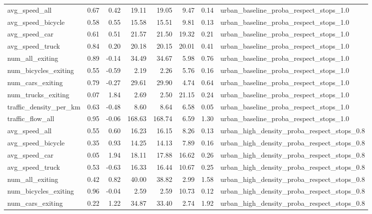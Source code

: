 \begin{table}[ht]
\begin{tabular}{lrrrrrrl}
  avg\_speed\_all & 0.67 & 0.42 & 19.11 & 19.05 & 9.47 & 0.14 & urban\_baseline\_proba\_respect\_stops\_1.0 \\ 
  avg\_speed\_bicycle & 0.58 & 0.55 & 15.58 & 15.51 & 9.81 & 0.13 & urban\_baseline\_proba\_respect\_stops\_1.0 \\ 
  avg\_speed\_car & 0.61 & 0.51 & 21.57 & 21.50 & 19.32 & 0.21 & urban\_baseline\_proba\_respect\_stops\_1.0 \\ 
  avg\_speed\_truck & 0.84 & 0.20 & 20.18 & 20.15 & 20.01 & 0.41 & urban\_baseline\_proba\_respect\_stops\_1.0 \\ 
  num\_all\_exiting & 0.89 & -0.14 & 34.49 & 34.67 & 5.98 & 0.76 & urban\_baseline\_proba\_respect\_stops\_1.0 \\ 
  num\_bicycles\_exiting & 0.55 & -0.59 & 2.19 & 2.26 & 5.76 & 0.16 & urban\_baseline\_proba\_respect\_stops\_1.0 \\ 
  num\_cars\_exiting & 0.79 & -0.27 & 29.61 & 29.90 & 4.74 & 0.64 & urban\_baseline\_proba\_respect\_stops\_1.0 \\ 
  num\_trucks\_exiting & 0.07 & 1.84 & 2.69 & 2.50 & 21.15 & 0.24 & urban\_baseline\_proba\_respect\_stops\_1.0 \\ 
  traffic\_density\_per\_km & 0.63 & -0.48 & 8.60 & 8.64 & 6.58 & 0.05 & urban\_baseline\_proba\_respect\_stops\_1.0 \\ 
  traffic\_flow\_all & 0.95 & -0.06 & 168.63 & 168.74 & 6.59 & 1.30 & urban\_baseline\_proba\_respect\_stops\_1.0 \\ 
  avg\_speed\_all & 0.55 & 0.60 & 16.23 & 16.15 & 8.26 & 0.13 & urban\_high\_density\_proba\_respect\_stops\_0.8 \\ 
  avg\_speed\_bicycle & 0.35 & 0.93 & 14.25 & 14.13 & 7.89 & 0.16 & urban\_high\_density\_proba\_respect\_stops\_0.8 \\ 
  avg\_speed\_car & 0.05 & 1.94 & 18.11 & 17.88 & 16.62 & 0.26 & urban\_high\_density\_proba\_respect\_stops\_0.8 \\ 
  avg\_speed\_truck & 0.53 & -0.63 & 16.33 & 16.44 & 10.67 & 0.25 & urban\_high\_density\_proba\_respect\_stops\_0.8 \\ 
  num\_all\_exiting & 0.42 & 0.82 & 40.00 & 38.82 & 2.99 & 1.58 & urban\_high\_density\_proba\_respect\_stops\_0.8 \\ 
  num\_bicycles\_exiting & 0.96 & -0.04 & 2.59 & 2.59 & 10.73 & 0.12 & urban\_high\_density\_proba\_respect\_stops\_0.8 \\ 
  num\_cars\_exiting & 0.22 & 1.22 & 34.87 & 33.40 & 2.74 & 1.92 & urban\_high\_density\_proba\_respect\_stops\_0.8 \\ 

\end{tabular}
\end{table}
